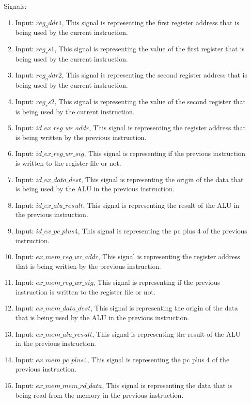 Signals:
\begin{enumerate}[label={\textbullet}]
    \item Input: $reg_addr1$, This signal is representing the first register address that is being used by the current instruction.
    \item Input: $reg_rs1$, This signal is representing the value of the first register that is being used by the current instruction.
    \item Input: $reg_addr2$, This signal is representing the second register address that is being used by the current instruction.
    \item Input: $reg_rs2$, This signal is representing the value of the second register that is being used by the current instruction.
    \item Input: $id\_ex\_reg\_wr\_addr$, This signal is representing the register address that is being written by the previous instruction.
    \item Input: $id\_ex\_reg\_wr\_sig$, This signal is representing if the previous instruction is written to the register file or not.
    \item Input: $id\_ex\_data\_dest$, This signal is representing the origin of the data that is being used by the ALU in the previous instruction.
    \item Input: $id\_ex\_alu\_result$, This signal is representing the result of the ALU in the previous instruction.
    \item Input: $id\_ex\_pc\_plus4$, This signal is representing the pc plus 4 of the previous instruction.
    \item Input: $ex\_mem\_reg\_wr\_addr$, This signal is representing the register address that is being written by the previous instruction.
    \item Input: $ex\_mem\_reg\_wr\_sig$, This signal is representing if the previous instruction is written to the register file or not.
    \item Input: $ex\_mem\_data\_dest$, This signal is representing the origin of the data that is being used by the ALU in the previous instruction.
    \item Input: $ex\_mem\_alu\_result$, This signal is representing the result of the ALU in the previous instruction.
    \item Input: $ex\_mem\_pc\_plus4$, This signal is representing the pc plus 4 of the previous instruction.
    \item Input: $ex\_mem\_mem\_rd\_data$, This signal is representing the data that is being read from the memory in the previous instruction.

\end{enumerate}
